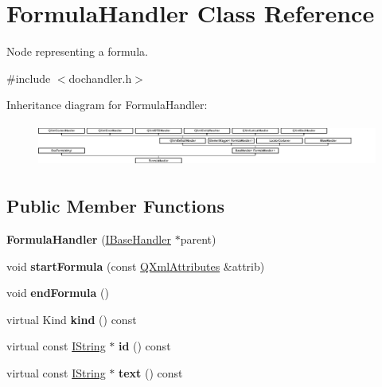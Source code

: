 \hypertarget{class_formula_handler}{}\section{Formula\+Handler Class Reference}
\label{class_formula_handler}


Node representing a formula.  




{\ttfamily \#include $<$dochandler.\+h$>$}

Inheritance diagram for Formula\+Handler\+:\begin{figure}[H]
\begin{center}
\leavevmode
\includegraphics[height=1.434978cm]{class_formula_handler}
\end{center}
\end{figure}
\subsection*{Public Member Functions}
\begin{DoxyCompactItemize}
\item 
\mbox{\label{class_formula_handler_aeed3112a4426209d365fe302355f41b8}} 
{\bfseries Formula\+Handler} (\mbox{\hyperlink{class_i_base_handler}{I\+Base\+Handler}} $\ast$parent)
\item 
\mbox{\label{class_formula_handler_ab8ab33296c90303b9c5b385d6e59d6cf}} 
void {\bfseries start\+Formula} (const \mbox{\hyperlink{class_q_xml_attributes}{Q\+Xml\+Attributes}} \&attrib)
\item 
\mbox{\label{class_formula_handler_a7f738ffb7f704d3a13a5f6d4e1a2a6be}} 
void {\bfseries end\+Formula} ()
\item 
\mbox{\label{class_formula_handler_a214871b830e8c94d18285b9f92ad7aaf}} 
virtual Kind {\bfseries kind} () const
\item 
\mbox{\label{class_formula_handler_ac6fd5cecbbc78566fe9ebf4bdc093f32}} 
virtual const \mbox{\hyperlink{class_i_string}{I\+String}} $\ast$ {\bfseries id} () const
\item 
\mbox{\label{class_formula_handler_a41ca589cefbf702c06d9598da182e59b}} 
virtual const \mbox{\hyperlink{class_i_string}{I\+String}} $\ast$ {\bfseries text} () const
\end{DoxyCompactItemize}
